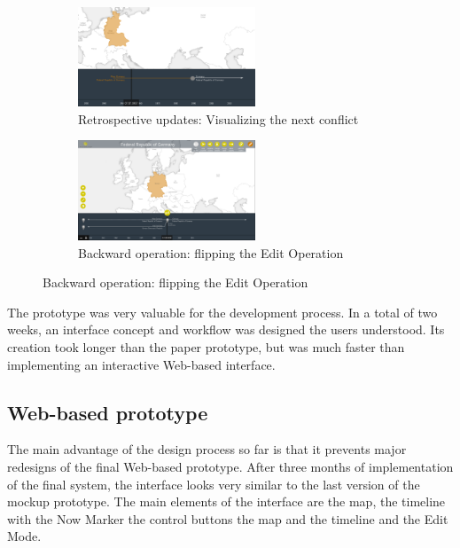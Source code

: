 \begin{figure}[ht]
\centering
\begin{subfigure}[b]{.5\textwidth}
  \centering
  \includegraphics[width=200px]{graphics/development/user_interface_design_process/retrospective_update.png}
  \caption{Retrospective updates: Visualizing the next conflict}
  \label{sfig:retrospective_update}
\end{subfigure}%
\begin{subfigure}[b]{.5\textwidth}
  \centering
  \includegraphics[width=200px]{graphics/development/user_interface_design_process/backward_change.png}
  \caption{Backward operation: flipping the Edit Operation}
  \label{sfig:backward_change}
\end{subfigure}
\label{fig:backward_change}
\end{figure}

The prototype was very valuable for the development process. In a total of two weeks, an interface concept and workflow was designed the users understood. Its creation took longer than the paper prototype, but was much faster than implementing an interactive Web-based interface.



\subsection{Web-based prototype} %
\label{sub:web_based_prototype}

The main advantage of the design process so far is that it prevents major redesigns of the final Web-based prototype. After three months of implementation of the final system, the interface looks very similar to the last version of the mockup prototype. The main elements of the interface are the map, the timeline with the Now Marker the control buttons the map and the timeline and the Edit Mode.

